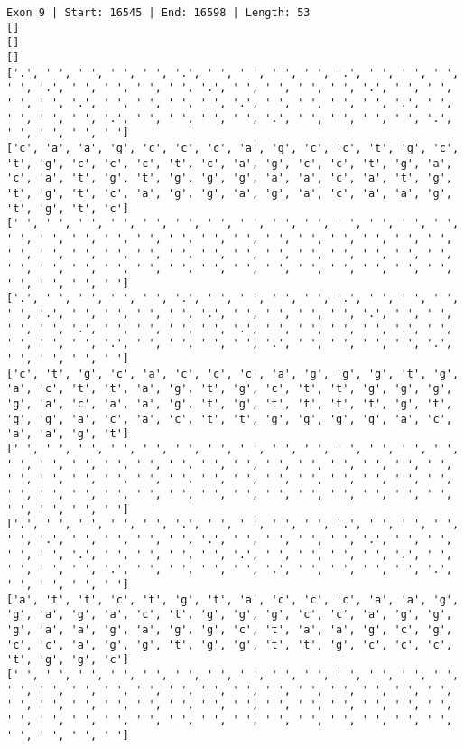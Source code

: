 \documentclass{article}
\begin{document}
\begin{Verbatim}
Exon 9 | Start: 16545 | End: 16598 | Length: 53
[]
[]
[]
['.', ' ', ' ', ' ', ' ', '.', ' ', ' ', ' ', ' ', '.', ' ', ' ', ' ', ' ', '.', ' ', ' ', ' ', ' ', '.', ' ', ' ', ' ', ' ', '.', ' ', ' ', ' ', ' ', '.', ' ', ' ', ' ', ' ', '.', ' ', ' ', ' ', ' ', '.', ' ', ' ', ' ', ' ', '.', ' ', ' ', ' ', ' ', '.', ' ', ' ', ' ', ' ', '.', ' ', ' ', ' ', ' ']
['c', 'a', 'a', 'g', 'c', 'c', 'c', 'a', 'g', 'c', 'c', 't', 'g', 'c', 't', 'g', 'c', 'c', 'c', 't', 'c', 'a', 'g', 'c', 'c', 't', 'g', 'a', 'c', 'a', 't', 'g', 't', 'g', 'g', 'g', 'a', 'a', 'c', 'a', 't', 'g', 't', 'g', 't', 'c', 'a', 'g', 'g', 'a', 'g', 'a', 'c', 'a', 'a', 'g', 't', 'g', 't', 'c']
[' ', ' ', ' ', ' ', ' ', ' ', ' ', ' ', ' ', ' ', ' ', ' ', ' ', ' ', ' ', ' ', ' ', ' ', ' ', ' ', ' ', ' ', ' ', ' ', ' ', ' ', ' ', ' ', ' ', ' ', ' ', ' ', ' ', ' ', ' ', ' ', ' ', ' ', ' ', ' ', ' ', ' ', ' ', ' ', ' ', ' ', ' ', ' ', ' ', ' ', ' ', ' ', ' ', ' ', ' ', ' ', ' ', ' ', ' ', ' ']
['.', ' ', ' ', ' ', ' ', '.', ' ', ' ', ' ', ' ', '.', ' ', ' ', ' ', ' ', '.', ' ', ' ', ' ', ' ', '.', ' ', ' ', ' ', ' ', '.', ' ', ' ', ' ', ' ', '.', ' ', ' ', ' ', ' ', '.', ' ', ' ', ' ', ' ', '.', ' ', ' ', ' ', ' ', '.', ' ', ' ', ' ', ' ', '.', ' ', ' ', ' ', ' ', '.', ' ', ' ', ' ', ' ']
['c', 't', 'g', 'c', 'a', 'c', 'c', 'c', 'a', 'g', 'g', 'g', 't', 'g', 'a', 'c', 't', 't', 'a', 'g', 't', 'g', 'c', 't', 't', 'g', 'g', 'g', 'g', 'a', 'c', 'a', 'a', 'g', 't', 'g', 't', 't', 't', 't', 'g', 't', 'g', 'g', 'a', 'c', 'a', 'c', 't', 't', 'g', 'g', 'g', 'g', 'a', 'c', 'a', 'a', 'g', 't']
[' ', ' ', ' ', ' ', ' ', ' ', ' ', ' ', ' ', ' ', ' ', ' ', ' ', ' ', ' ', ' ', ' ', ' ', ' ', ' ', ' ', ' ', ' ', ' ', ' ', ' ', ' ', ' ', ' ', ' ', ' ', ' ', ' ', ' ', ' ', ' ', ' ', ' ', ' ', ' ', ' ', ' ', ' ', ' ', ' ', ' ', ' ', ' ', ' ', ' ', ' ', ' ', ' ', ' ', ' ', ' ', ' ', ' ', ' ', ' ']
['.', ' ', ' ', ' ', ' ', '.', ' ', ' ', ' ', ' ', '.', ' ', ' ', ' ', ' ', '.', ' ', ' ', ' ', ' ', '.', ' ', ' ', ' ', ' ', '.', ' ', ' ', ' ', ' ', '.', ' ', ' ', ' ', ' ', '.', ' ', ' ', ' ', ' ', '.', ' ', ' ', ' ', ' ', '.', ' ', ' ', ' ', ' ', '.', ' ', ' ', ' ', ' ', '.', ' ', ' ', ' ', ' ']
['a', 't', 't', 'c', 't', 'g', 't', 'a', 'c', 'c', 'c', 'a', 'a', 'g', 'g', 'a', 'g', 'a', 'c', 't', 'g', 'g', 'g', 'c', 'c', 'a', 'g', 'g', 'g', 'a', 'a', 'g', 'a', 'g', 'g', 'c', 't', 'a', 'a', 'g', 'c', 'g', 'c', 'c', 'a', 'g', 'g', 't', 'g', 'g', 't', 't', 'g', 'c', 'c', 'c', 't', 'g', 'g', 'c']
[' ', ' ', ' ', ' ', ' ', ' ', ' ', ' ', ' ', ' ', ' ', ' ', ' ', ' ', ' ', ' ', ' ', ' ', ' ', ' ', ' ', ' ', ' ', ' ', ' ', ' ', ' ', ' ', ' ', ' ', ' ', ' ', ' ', ' ', ' ', ' ', ' ', ' ', ' ', ' ', ' ', ' ', ' ', ' ', ' ', ' ', ' ', ' ', ' ', ' ', ' ', ' ', ' ', ' ', ' ', ' ', ' ', ' ', ' ', ' ']

\end{Verbatim}
\end{document}
